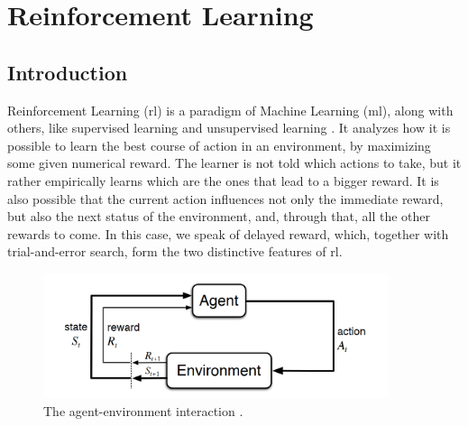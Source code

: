 \chapter{Reinforcement Learning} %
\label{chap:RL}


\section{Introduction}


Reinforcement Learning (\acrshort{rl}) is a paradigm of Machine Learning (\acrshort{ml}), along with others, like supervised learning and unsupervised learning \cite{SuttonBarto}. It analyzes how it is possible to learn the best course of action in an environment, by maximizing some given numerical reward. The learner is not told which actions to take, but it rather empirically learns which are the ones that lead to a bigger reward. It is also possible that the current action influences not only the immediate reward, but also the next status of the environment, and, through that, all the other rewards to come. In this case, we speak of delayed reward, which, together with trial-and-error search, form the two distinctive features of \acrshort{rl}.

\begin{figure}[!ht]
    \centering
    \includegraphics[width=0.9\textwidth]{chapters/figures/MDP-diagram.png}
    \caption{The agent-environment interaction \cite{SuttonBarto}.}
    \label{fig:MDP}
\end{figure}

